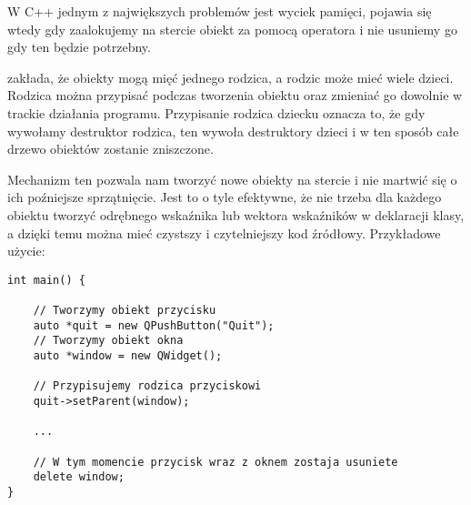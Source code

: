 
\par
W C++ jednym z największych problemów jest wyciek pamięci, pojawia się wtedy gdy zaalokujemy na stercie obiekt za pomocą operatora  i nie usuniemy go gdy ten będzie potrzebny.
\par
{} zakłada, że obiekty mogą mięć jednego rodzica, a rodzic może mieć wiele dzieci.
Rodzica można przypisać podczas tworzenia obiektu oraz zmieniać go dowolnie w trackie działania programu.
Przypisanie rodzica dziecku oznacza to, że gdy wywołamy destruktor rodzica, ten wywoła destruktory dzieci i w ten sposób całe drzewo obiektów zostanie zniszczone.
\par
Mechanizm ten pozwala nam tworzyć nowe obiekty na stercie i nie martwić się o ich poźniejsze sprzątnięcie.
Jest to o tyle efektywne, że nie trzeba dla każdego obiektu tworzyć odrębnego wskaźnika lub wektora wskaźników w deklaracji klasy, a dzięki temu można mieć czystszy i czytelniejszy kod źródłowy.
Przykładowe użycie:
\par
\begin{lstlisting}
int main() {

    // Tworzymy obiekt przycisku
    auto *quit = new QPushButton("Quit");
    // Tworzymy obiekt okna
    auto *window = new QWidget();

    // Przypisujemy rodzica przyciskowi
    quit->setParent(window);
    
    ...

    // W tym momencie przycisk wraz z oknem zostaja usuniete
    delete window;
}
\end{lstlisting}